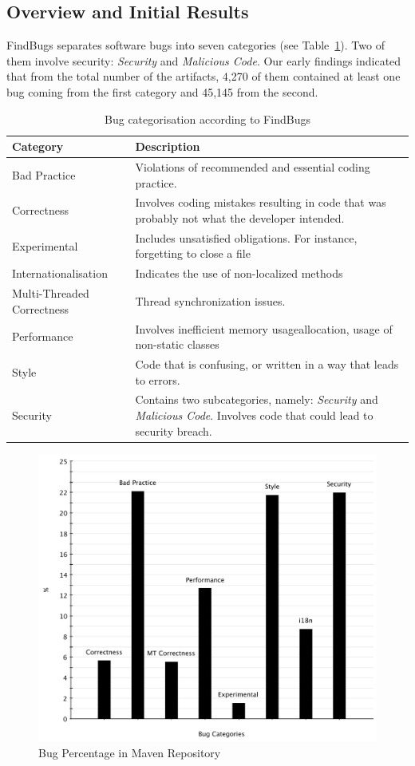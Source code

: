 \documentclass[conference]{IEEEtran}
\begin{document}
\subsection{Overview and Initial Results}
\label{sec:overview}

FindBugs separates software bugs into seven categories (see
Table~\ref{tbl:bug-cat}). Two of them involve security: {\it Security} and {\it
Malicious Code}. Our early findings indicated that from the total number of the
artifacts, 4,270 of them contained at least one bug coming from the first category
and 45,145 from the second.

\begin{table}
\centering
\caption{Bug categorisation according to FindBugs}
\label{tbl:bug-cat}
\begin{tabular}{l p{15em}}
\hline
Category & Description\\
\hline
Bad Practice & Violations of recommended and essential
coding practice. \\
Correctness & Involves coding mistakes resulting in code
that was probably not what the developer intended. \\
Experimental & Includes unsatisfied obligations. For instance,
forgetting to close a file \\
Internationalisation & Indicates the use of non-localized methods \\
Multi-Threaded Correctness & Thread synchronization issues. \\
Performance & Involves inefficient memory usageallocation, usage 
of non-static classes \\
Style & Code that is confusing, or
written in a way that leads to errors.\\
Security & Contains two subcategories, namely: {\it Security} and {\it
Malicious Code}. Involves code that could lead to security breach. \\
\hline
\end{tabular}
\end{table}\begin{figure}
	\centering
	\includegraphics[scale=0.6]{bug_percent}
	\caption{Bug Percentage in Maven Repository}
	\label{fig:bug-per}
\end{figure}
\end{document}
